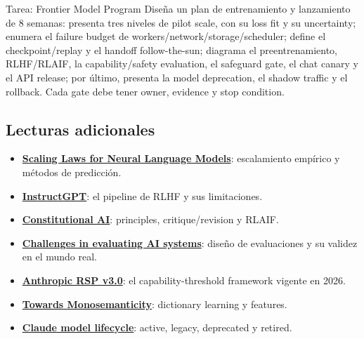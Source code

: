 \begin{importantbox}{Tarea: Frontier Model Program}
Diseña un plan de entrenamiento y lanzamiento de 8 semanas: presenta tres niveles de pilot scale, con su loss fit y su uncertainty; enumera el failure budget de workers/network/storage/scheduler; define el checkpoint/replay y el handoff follow-the-sun; diagrama el preentrenamiento, RLHF/RLAIF, la capability/safety evaluation, el safeguard gate, el chat canary y el API release; por último, presenta la model deprecation, el shadow traffic y el rollback. Cada gate debe tener owner, evidence y stop condition.
\end{importantbox}

\subsection{Lecturas adicionales}

{\small
\begin{itemize}[nosep,leftmargin=*]
  \item \href{https://arxiv.org/abs/2001.08361}{\textbf{Scaling Laws for Neural Language Models}}: escalamiento empírico y métodos de predicción.
  \item \href{https://arxiv.org/abs/2203.02155}{\textbf{InstructGPT}}: el pipeline de RLHF y sus limitaciones.
  \item \href{https://www.anthropic.com/research/constitutional-ai-harmlessness-from-ai-feedback}{\textbf{Constitutional AI}}: principles, critique/revision y RLAIF.
  \item \href{https://www.anthropic.com/research/evaluating-ai-systems}{\textbf{Challenges in evaluating AI systems}}: diseño de evaluaciones y su validez en el mundo real.
  \item \href{https://www.anthropic.com/responsible-scaling-policy/rsp-v3-0}{\textbf{Anthropic RSP v3.0}}: el capability-threshold framework vigente en 2026.
  \item \href{https://www.anthropic.com/research/towards-monosemanticity-decomposing-language-models-with-dictionary-learning}{\textbf{Towards Monosemanticity}}: dictionary learning y features.
  \item \href{https://docs.anthropic.com/en/docs/about-claude/model-deprecations}{\textbf{Claude model lifecycle}}: active, legacy, deprecated y retired.
\end{itemize}
}


